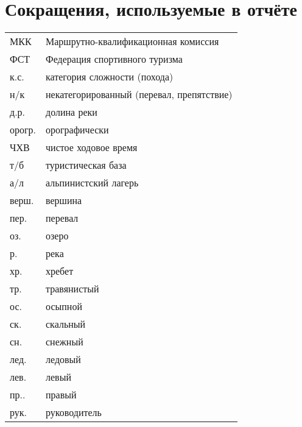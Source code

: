 \section*{Сокращения, используемые в отчёте}
\begin{tabular}{p{} p{}}
	МКК                                  &   Маршрутно-квалификационная комиссия  \\
	ФСТ                                &   Федерация спортивного туризма  \\
	к.с.                               &   категория сложности (похода)  \\
	н/к                            &   некатегорированный (перевал, препятствие) \\
	д.р.                            &   долина реки \\
	орогр.                &   орографически  \\
	ЧХВ                          &   чистое ходовое время  \\
	т/б                         &   туристическая база \\
	а/л                  &   альпинистский лагерь \\
	верш.               &   вершина \\
	пер.               &   перевал \\
	оз.             &   озеро \\
	р.             &   река \\
	хр. &   хребет \\
	тр. &   травянистый \\
	ос. &   осыпной \\
	ск. &   скальный \\
	сн. &   снежный \\
	лед. &   ледовый \\
	лев. &   левый \\
	пр..&   правый \\
	рук. &   руководитель \\

	
\end{tabular}
